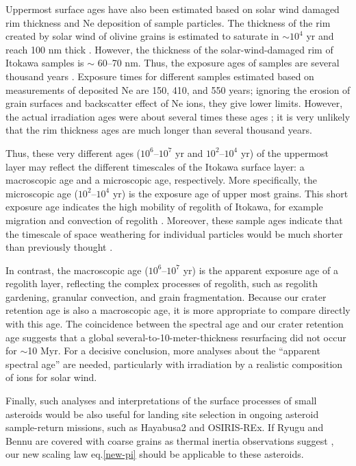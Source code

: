 \documentclass[3p,authoryear]{elsarticle}
\begin{document}
Uppermost surface ages have also been estimated based on solar wind damaged rim thickness and Ne deposition of sample particles. The thickness of the rim created by solar wind of olivine grains is estimated to saturate in $\sim 10^4$ yr and reach 100 nm thick \citep{keller2016}. However, the thickness of the solar-wind-damaged rim of Itokawa samples is $\sim$ 60--70 nm. Thus, the exposure ages of samples are several thousand years \citep{berger2015}. Exposure times for different samples estimated based on measurements of deposited Ne are 150, 410, and 550 years; ignoring the erosion of grain surfaces and backscatter effect of Ne ions, they give lower limits. However, the actual irradiation ages were about several times these ages \citep{nagao2011}; it is very unlikely that the rim thickness ages are much longer than several thousand years.

Thus, these very different ages ($10^6$--$10^7$ yr and $10^2$--$10^4$ yr) of the uppermost layer may reflect the different timescales of the Itokawa surface layer: a macroscopic age and a microscopic age, respectively. More specifically, the microscopic age ($10^2$--$10^4$ yr) is the exposure age of upper most grains. This short exposure age indicates the high mobility of regolith of Itokawa, for example migration and convection of regolith \citep[e.g.,][]{miyamoto2007}. Moreover, these sample ages indicate that the timescale of space weathering for individual particles would be much shorter than previously thought \citep{strazzulla2005}.

In contrast, the macroscopic age ($10^6$--$10^7$ yr) is the apparent exposure age of a regolith layer, reflecting the complex processes of regolith, such as regolith gardening, granular convection, and grain fragmentation. Because our crater retention age is also a macroscopic age, it is more appropriate to compare directly with this age. The coincidence between the spectral age and our crater retention age suggests that a global several-to-10-meter-thickness resurfacing did not occur for $\sim$10 Myr. For a decisive conclusion, more analyses about the “apparent spectral age” are needed, particularly with irradiation by a realistic composition of ions for solar wind. 

Finally, such analyses and interpretations of the surface processes of small asteroids would be also useful for landing site selection in ongoing asteroid sample-return missions, such as Hayabusa2 and OSIRIS-REx. If Ryugu and Bennu are covered with coarse grains as thermal inertia observations suggest \citep{hasegawa2008, emery2014,mueller2016}, our new scaling law eq.\eqref{new-pi} should be applicable to these asteroids. 
\end{document}
